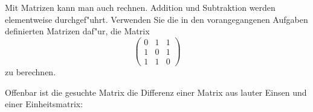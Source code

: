 Mit Matrizen kann man auch rechnen. Addition und Subtraktion werden
elementweise durchgef"uhrt. Verwenden Sie die in den vorangegangenen
Aufgaben definierten Matrizen daf"ur, die Matrix
\[
\begin{pmatrix}
0&1&1\\
1&0&1\\
1&1&0
\end{pmatrix}
\]
zu berechnen.

\begin{loesung}
Offenbar ist die gesuchte Matrix die Differenz einer Matrix aus lauter
Einsen und einer Einheitsmatrix:
\end{loesung}

